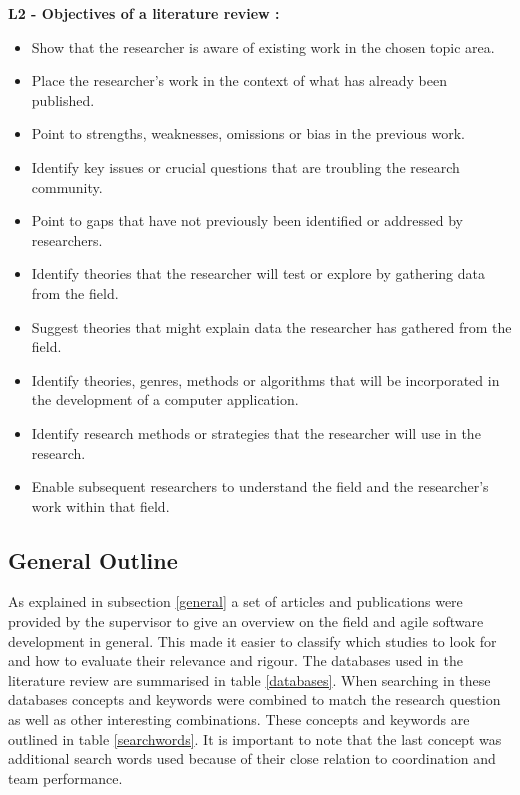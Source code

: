 \vspace{0.5cm}

\begin{tcolorbox}[breakable, enhanced]
\textbf{L2 - Objectives of a literature review \cite{Oates2006}:}

\begin{itemize}
  \item Show that the researcher is aware of existing work in the chosen topic area.
  \item Place the researcher's work in the context of what has already been published.
  \item Point to strengths, weaknesses, omissions or bias in the previous work.
  \item Identify key issues or crucial questions that are troubling the research community.
  \item Point to gaps that have not previously been identified or addressed by researchers.
  \item Identify theories that the researcher will test or explore by gathering data from the field.
  \item Suggest theories that might explain data the researcher has gathered from the field.
  \item Identify theories, genres, methods or algorithms that will be incorporated in the development of a computer application.
  \item Identify research methods or strategies that the researcher will use in the research.
  \item Enable subsequent researchers to understand the field and the researcher's work within that field.
\end{itemize}
\end{tcolorbox}

\vspace{0.5cm}

\subsection{General Outline}

As explained in subsection \ref{general} a set of articles and publications were provided by the supervisor to give an overview on the field and agile software development in general. This made it easier to classify which studies to look for and how to evaluate their relevance and rigour. The databases used in the literature review are summarised in table \ref{databases}. When searching in these databases concepts and keywords were combined to match the research question as well as other interesting combinations. These concepts and keywords are outlined in table \ref{searchwords}. It is important to note that the last concept was additional search words used because of their close relation to coordination and team performance.

